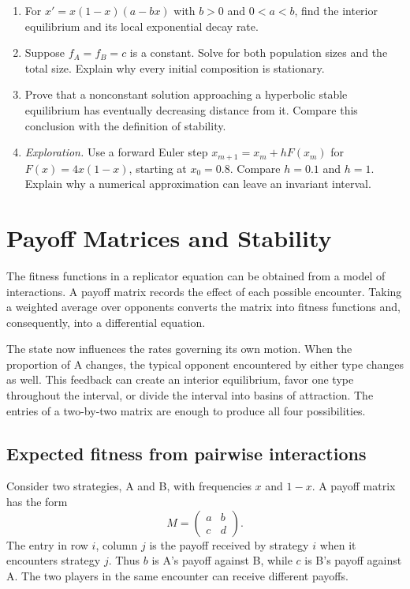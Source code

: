 \documentclass[11pt,oneside,openany]{book}
\theoremstyle{definition}
\theoremstyle{remark}
\newenvironment{exercises}{\begin{enumerate}[label=\thechapter.\arabic*,ref=\thechapter.\arabic*,leftmargin=2.8em,itemsep=6pt]}{\end{enumerate}}
\numberwithin{equation}{chapter}
\begin{document}
\begin{exercises}
\item For $x'=x(1-x)(a-bx)$ with $b>0$ and $0<a<b$, find the interior equilibrium and its local exponential decay rate.
\item Suppose $f_A=f_B=c$ is a constant. Solve for both population sizes and the total size. Explain why every initial composition is stationary.
\item Prove that a nonconstant solution approaching a hyperbolic stable equilibrium has eventually decreasing distance from it. Compare this conclusion with the definition of stability.
\item \emph{Exploration.} Use a forward Euler step $x_{m+1}=x_m+hF(x_m)$ for $F(x)=4x(1-x)$, starting at $x_0=0.8$. Compare $h=0.1$ and $h=1$. Explain why a numerical approximation can leave an invariant interval.
\end{exercises}

\chapter{Payoff Matrices and Stability}
\label{ch:payoffs}

The fitness functions in a replicator equation can be obtained from a model of interactions. A payoff matrix records the effect of each possible encounter. Taking a weighted average over opponents converts the matrix into fitness functions and, consequently, into a differential equation.

The state now influences the rates governing its own motion. When the proportion of A changes, the typical opponent encountered by either type changes as well. This feedback can create an interior equilibrium, favor one type throughout the interval, or divide the interval into basins of attraction. The entries of a two-by-two matrix are enough to produce all four possibilities.

\section{Expected fitness from pairwise interactions}
Consider two strategies, A and B, with frequencies $x$ and $1-x$. A payoff matrix has the form
\begin{equation}\label{eq:matrix2}
M=\begin{pmatrix}a&b\\c&d\end{pmatrix}.
\end{equation}
The entry in row $i$, column $j$ is the payoff received by strategy $i$ when it encounters strategy $j$. Thus $b$ is A's payoff against B, while $c$ is B's payoff against A. The two players in the same encounter can receive different payoffs.
\end{document}
